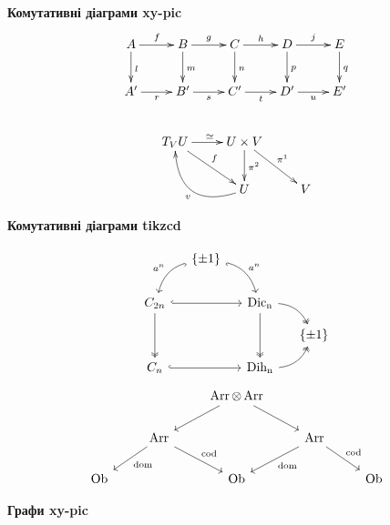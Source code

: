 \documentclass[14pt]{extarticle}
\begin{document}
    \textbf{Комутативні діаграми xy-pic}
    \begin{gather*}
        \xymatrix{
            A \ar[r]^{f} \ar[d]^{l} & B \ar[r]^{g} \ar[d]^{m} & C \ar[r]^{h} \ar[d]^{n} & D \ar[r]^{j} \ar[d]^{p} & E \ar[d]^{q} \\
            A' \ar[r]_{r} & B' \ar[r]_{s} & C' \ar[r]_{t} & D' \ar[r]_{u} & E' \\
        } \\
        \hspace{5cm} \\
        \xymatrix{
            T_V U \ar[r]^{\simeq} \ar[rd]^{f} & U \times V \ar[d]^{\pi ^ 2} \ar[rd]^{\pi ^ 1} \\
            & U \ar@/^{2pc}/[ul]^{v} & V
        }\\
    \end{gather*}

    \textbf{Комутативні діаграми tikzcd}

    \[
        \begin{tikzcd}[column sep=small,row sep=small]
            & \{\pm 1\} \arrow[hook,bend right,swap]{ldd}{a ^ n} \arrow[hook',bend left]{rdd}{a ^ n} \\
            & & & \\
            C_{2 n} \arrow[hook]{rr} \arrow[two heads]{dd}
            &
            & \operatorname{Dic_n} \arrow[two heads]{dd} \arrow[bend left,two heads]{rd} \\
            & & & \{\pm 1\} \\
            C_n \arrow[hook]{rr} & & \operatorname{Dih_n} \arrow[bend right,two heads]{ru}
        \end{tikzcd}
    \]
    \[
        \begin{tikzcd}
            & & \operatorname{Arr} \otimes \operatorname{Arr} \arrow{ld} \arrow{rd} \\
            & \operatorname{Arr} \arrow{ld}{\operatorname{dom}} \arrow{rd}{\operatorname{cod}}
            &
            & \operatorname{Arr} \arrow{ld}{\operatorname{dom}} \arrow{rd}{\operatorname{cod}} \\
            \operatorname{Ob} & & \operatorname{Ob} & & \operatorname{Ob}
        \end{tikzcd}
    \]

    \newpage

    \textbf{Графи xy-pic}
\end{document}
